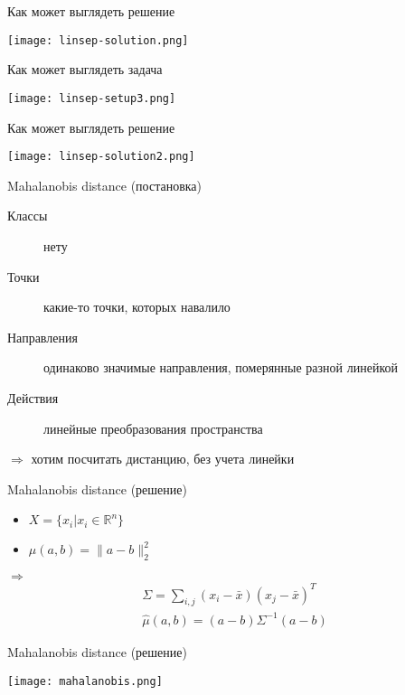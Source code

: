 \documentclass[14pt, fleqn, xcolor={dvipsnames, table}]{beamer}
\begin{document}
\begin{frame}{Как может выглядеть решение}
\begin{center}
\texttt{[image: linsep-solution.png]}
\end{center}
\end{frame}

\begin{frame}{Как может выглядеть задача}
\begin{center}
\texttt{[image: linsep-setup3.png]}
\end{center}
\end{frame}

\begin{frame}{Как может выглядеть решение}
\begin{center}
\texttt{[image: linsep-solution2.png]}
\end{center}
\end{frame}

\begin{frame}{Mahalanobis distance (постановка)}
\begin{description}
\item[Классы] нету
\item[Точки] какие-то точки, которых навалило
\item[Направления] одинаково значимые направления, померянные разной линейкой
\item[Действия] линейные преобразования пространства
\end{description}
$\Rightarrow$ хотим посчитать дистанцию, без учета линейки
\end{frame}

\begin{frame}{Mahalanobis distance (решение)}
\begin{itemize}
  \item $X = \{x_i | x_i \in \mathbb{R}^n\}$
  \item $\mu(a,b) = \|a - b\|_2^2$
\end{itemize}
$\Rightarrow$
$$\begin{array}{c}
\Sigma = \sum_{i,j} \left(x_i - \bar{x}\right)\left(x_j - \bar{x}\right)^T \\
\hat{\mu}(a,b) = \left(a - b\right) \Sigma^{-1} \left(a - b\right)
\end{array}$$
\end{frame}

\begin{frame}{Mahalanobis distance (решение)}
\begin{center}
\texttt{[image: mahalanobis.png]}
\end{center}
\end{frame}
\end{document}
